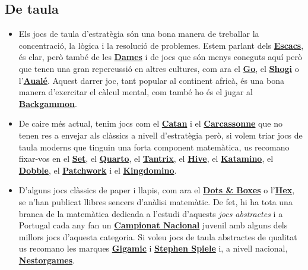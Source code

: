 \documentclass[a4paper, 12pt]{article}
\begin{document}
        \subsection*{De taula}

            \begin{itemize}
                \item Els jocs de taula d'estratègia són una bona manera de treballar la concentració, la lògica i la resolució de problemes. Estem parlant dels \href{https://ca.wikipedia.org/wiki/Escacs}{\textbf{Escacs}}, és clar, però també de les \href{https://ca.wikipedia.org/wiki/Dames}{\textbf{Dames}} i de jocs que són menys coneguts aquí però que tenen una gran repercussió en altres cultures, com ara el \href{https://ca.wikipedia.org/wiki/Go}{\textbf{Go}}, el \href{https://ca.wikipedia.org/wiki/Sh\%C5\%8Dgi}{\textbf{Shogi}} o l'\href{https://ca.wikipedia.org/wiki/Aual\%C3\%A9}{\textbf{Aualé}}. Aquest darrer joc, tant popular al continent africà, és una bona manera d'exercitar el càlcul mental, com també ho és el jugar al \href{https://ca.wikipedia.org/wiki/Backgammon}{\textbf{Backgammon}}.
                \item De caire més actual, tenim jocs com el \href{https://boardgamegeek.com/boardgame/13/catan}{\textbf{Catan}} i el \href{https://boardgamegeek.com/boardgame/822/carcassonne}{\textbf{Carcassonne}} que no tenen res a envejar als clàssics a nivell d'estratègia però, si volem triar jocs de taula moderns que tinguin una forta component matemàtica, us recomano fixar-vos en el \href{https://boardgamegeek.com/boardgame/1198/set}{\textbf{Set}}, el \href{https://boardgamegeek.com/boardgame/681/quarto}{\textbf{Quarto}}, el \href{https://boardgamegeek.com/boardgame/1038/tantrix}{\textbf{Tantrix}}, el \href{https://boardgamegeek.com/boardgame/2655/hive}{\textbf{Hive}}, el \href{https://boardgamegeek.com/boardgame/6931/katamino}{\textbf{Katamino}}, el \href{https://boardgamegeek.com/boardgame/63268/spot-it}{\textbf{Dobble}}, el \href{https://boardgamegeek.com/boardgame/163412/patchwork}{\textbf{Patchwork}} i el \href{https://boardgamegeek.com/boardgame/204583/kingdomino}{\textbf{Kingdomino}}.
                \item D'alguns jocs clàssics de paper i llapis, com ara el \href{https://ca.wikipedia.org/wiki/Quadrats}{\textbf{Dots \& Boxes}} o l'\href{https://ca.wikipedia.org/wiki/Hex_(joc)}{\textbf{Hex}}, se n'han publicat llibres sencers d'anàlisi matemàtic. De fet, hi ha tota una branca de la matemàtica dedicada a l'estudi d'aquests \emph{jocs abstractes} i a Portugal cada any fan un \href{http://ludicum.org/cnjm}{\textbf{Campionat Nacional}} juvenil amb alguns dels millors jocs d'aquesta categoria. Si voleu jocs de taula abstractes de qualitat us recomano les marques \href{https://www.gigamic.com/}{\textbf{Gigamic}} i \href{https://www.steffen-spiele.de/}{\textbf{Stephen Spiele}} i, a nivell nacional, \href{https://nestorgames.com}{\textbf{Nestorgames}}.
            \end{itemize}
\end{document}
